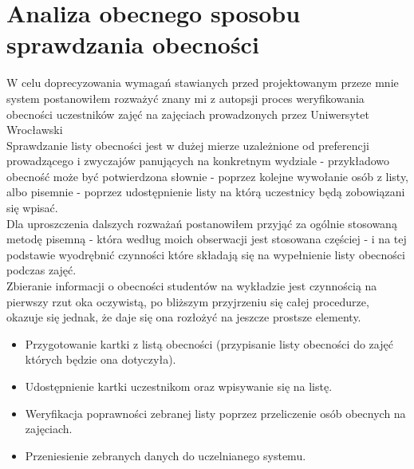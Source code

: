 \documentclass[declaration,shortabstract, mgr]{iithesis}
\begin{document}
\section{Analiza obecnego sposobu sprawdzania obecności}
W celu doprecyzowania wymagań stawianych przed projektowanym przeze mnie system postanowiłem rozważyć znany mi z autopsji proces weryfikowania obecności uczestników zajęć na zajęciach prowadzonych przez Uniwersytet Wrocławski\\
\indent Sprawdzanie listy obecności jest w dużej mierze uzależnione od preferencji prowadzącego i zwyczajów panujących na konkretnym wydziale - przykładowo obecność może być potwierdzona słownie - poprzez kolejne wywołanie osób z listy, albo pisemnie - poprzez udostępnienie listy na którą uczestnicy będą zobowiązani się wpisać.\\
\indent Dla uproszczenia dalszych rozważań postanowiłem przyjąć za ogólnie stosowaną metodę pisemną - która według moich obserwacji jest stosowana częściej - i na tej podstawie wyodrębnić czynności które składają się na wypełnienie listy obecności podczas zajęć.\\
\indent Zbieranie informacji o obecności studentów na wykładzie jest czynnością na pierwszy rzut oka oczywistą, po bliższym przyjrzeniu się całej procedurze, okazuje się jednak, że daje się ona rozłożyć na jeszcze prostsze elementy. \\

\begin{itemize}
\item Przygotowanie kartki z listą obecności (przypisanie listy obecności do zajęć których będzie ona dotyczyła).
\item Udostępnienie kartki uczestnikom oraz wpisywanie się na listę.
\item Weryfikacja poprawności zebranej listy poprzez przeliczenie osób obecnych na zajęciach.
\item Przeniesienie zebranych danych do uczelnianego systemu.
\end{itemize}
\end{document}
